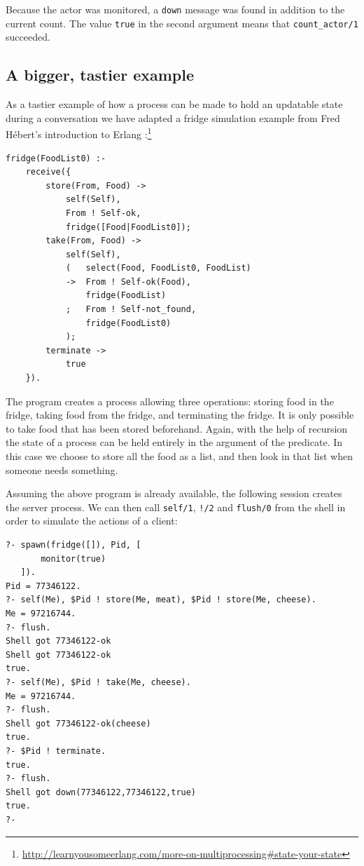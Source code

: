 \noindent Because the actor was monitored, a \texttt{down} message was found in addition to the current count. The value \texttt{true} in the second argument means that \texttt{count\_actor/1} succeeded.

\subsection{A bigger, tastier example}

As a tastier example of how a process can be made to hold an updatable state during a conversation we have adapted a fridge simulation example from Fred H\'ebert's introduction to Erlang \cite{Hebert:2013:LYE:2543986}:\footnote{\url{http://learnyousomeerlang.com/more-on-multiprocessing\#state-your-state}}

\begin{verbatim}
fridge(FoodList0) :-
    receive({
        store(From, Food) ->
            self(Self),
            From ! Self-ok,
            fridge([Food|FoodList0]);
        take(From, Food) ->
            self(Self),
            (   select(Food, FoodList0, FoodList)
            ->  From ! Self-ok(Food),
                fridge(FoodList)
            ;   From ! Self-not_found,
                fridge(FoodList0)
            );
        terminate ->
            true
    }).
\end{verbatim}

\noindent The program creates a process allowing three operations: storing food in the fridge, taking food from the fridge, and terminating the fridge. It is only possible to take food that has been stored beforehand. Again, with the help of recursion the state of a process can be held entirely in the argument of the predicate. In this case we choose to store all the food as a list, and then look in that list when someone needs something.

Assuming the above program is already available, the following session creates the server process. We can then call \texttt{self/1}, \texttt{!/2} and \texttt{flush/0} from the shell in order to simulate the actions of a client:

\begin{verbatim}
?- spawn(fridge([]), Pid, [
       monitor(true)
   ]).
Pid = 77346122.
?- self(Me), $Pid ! store(Me, meat), $Pid ! store(Me, cheese).
Me = 97216744.
?- flush.
Shell got 77346122-ok
Shell got 77346122-ok
true.
?- self(Me), $Pid ! take(Me, cheese).
Me = 97216744.
?- flush.
Shell got 77346122-ok(cheese)
true.
?- $Pid ! terminate.
true.
?- flush.
Shell got down(77346122,77346122,true)
true.
?-
\end{verbatim}

